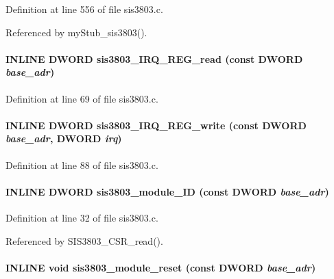 Definition at line 556 of file sis3803.c.

Referenced by myStub\_\-sis3803().
\paragraph[{sis3803\_\-IRQ\_\-REG\_\-read}]{\setlength{\rightskip}{0pt plus 5cm}INLINE {\bf DWORD} sis3803\_\-IRQ\_\-REG\_\-read (const {\bf DWORD} {\em base\_\-adr})}\hfill\label{sis3803_8c_a69b1dfd744d5baf274bc11e65c59aa30}


Definition at line 69 of file sis3803.c.
\paragraph[{sis3803\_\-IRQ\_\-REG\_\-write}]{\setlength{\rightskip}{0pt plus 5cm}INLINE {\bf DWORD} sis3803\_\-IRQ\_\-REG\_\-write (const {\bf DWORD} {\em base\_\-adr}, \/  {\bf DWORD} {\em irq})}\hfill\label{sis3803_8c_a1a6674b03260b1ade32330dc0525694a}


Definition at line 88 of file sis3803.c.
\paragraph[{sis3803\_\-module\_\-ID}]{\setlength{\rightskip}{0pt plus 5cm}INLINE {\bf DWORD} sis3803\_\-module\_\-ID (const {\bf DWORD} {\em base\_\-adr})}\hfill\label{sis3803_8c_a275831e442730a4519dac664242ccd0b}


Definition at line 32 of file sis3803.c.

Referenced by SIS3803\_\-CSR\_\-read().
\paragraph[{sis3803\_\-module\_\-reset}]{\setlength{\rightskip}{0pt plus 5cm}INLINE void sis3803\_\-module\_\-reset (const {\bf DWORD} {\em base\_\-adr})}\hfill\label{sis3803_8c_ae79976c02260f91ed373bf210215abba}


